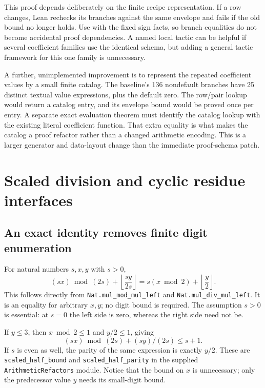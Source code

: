 \documentclass[11pt,letterpaper]{article}
\newcommand{\code}[1]{\nolinkurl{#1}}
\begin{document}
This proof depends deliberately on the finite recipe representation. If a row
changes, Lean rechecks its branches against the same envelope and fails if the
old bound no longer holds. Use \texttt{} with the fixed sign facts,
so branch equalities do not become accidental proof dependencies. A named local
tactic can be helpful if several coefficient families use the identical
schema, but adding a general tactic framework for this one family is unnecessary.

A further, unimplemented improvement is to represent the repeated coefficient
values by a small finite catalog. The baseline's 136 nondefault branches have
25 distinct textual value expressions, plus the default zero. The row/pair
lookup would return a catalog
entry, and its envelope bound would be proved once per entry. A separate exact
evaluation theorem must identify the catalog lookup with the existing literal
coefficient function. That extra equality is what makes the catalog a proof
refactor rather than a changed arithmetic encoding. This is a larger generator
and data-layout change than the immediate proof-schema patch.

\section{Scaled division and cyclic residue interfaces}

\subsection{An exact identity removes finite digit enumeration}

For natural numbers $s,x,y$ with $s>0$,
\begin{equation}\label{eq:scaled}
 (sx)\bmod(2s)+\left\lfloor\frac{sy}{2s}\right\rfloor
 =s(x\bmod2)+\left\lfloor\frac y2\right\rfloor.
\end{equation}
This follows directly from \code{Nat.mul_mod_mul_left} and
\code{Nat.mul_div_mul_left}. It is an equality for arbitrary $x,y$; no digit
bound is required. The assumption $s>0$ is essential: at $s=0$ the left side
is zero, whereas the right side need not be.

If $y\leq3$, then $x\bmod2\leq1$ and $y/2\leq1$, giving
\[
 (sx)\bmod(2s)+(sy)/(2s)\leq s+1.
\]
If $s$ is even as well, the parity of the same expression is exactly $y/2$.
These are \code{scaled_half_bound} and \code{scaled_half_parity} in the supplied
\code{ArithmeticRefactors} module. Notice that the bound on $x$ is unnecessary;
only the predecessor value $y$ needs its small-digit bound.
\end{document}
